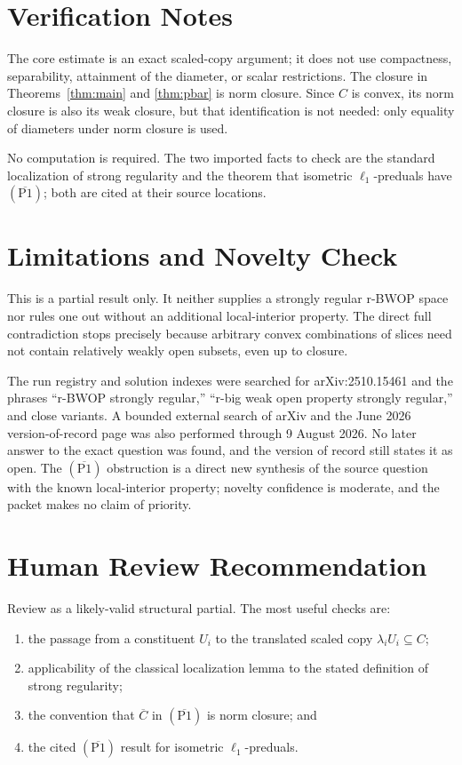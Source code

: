 \documentclass[11pt]{article}
\newcommand{\Pbar}{(\overline{\mathrm{P1}})}
\begin{document}
\section*{Verification Notes}

The core estimate is an exact scaled-copy argument; it does not use compactness,
separability, attainment of the diameter, or scalar restrictions. The closure
in Theorems~\ref{thm:main} and \ref{thm:pbar} is norm closure. Since $C$ is
convex, its norm closure is also its weak closure, but that identification is
not needed: only equality of diameters under norm closure is used.

No computation is required. The two imported facts to check are the standard
localization of strong regularity and the theorem that isometric
$\ell_1$-preduals have $\Pbar$; both are cited at their source locations.

\section*{Limitations and Novelty Check}

This is a partial result only. It neither supplies a strongly regular r-BWOP
space nor rules one out without an additional local-interior property. The
direct full contradiction stops precisely because arbitrary convex combinations
of slices need not contain relatively weakly open subsets, even up to closure.

The run registry and solution indexes were searched for arXiv:2510.15461 and
the phrases ``r-BWOP strongly regular,'' ``r-big weak open property strongly
regular,'' and close variants. A bounded external search of arXiv and the
June 2026 version-of-record page was also performed through 9 August 2026. No
later answer to the exact question was found, and the version of record still
states it as open. The $\Pbar$ obstruction is a direct new synthesis of the
source question with the known local-interior property; novelty confidence is
moderate, and the packet makes no claim of priority.

\section*{Human Review Recommendation}

Review as a likely-valid structural partial. The most useful checks are:
\begin{enumerate}
\item the passage from a constituent $U_i$ to the translated scaled copy
      $\lambda_iU_i\subseteq C$;
\item applicability of the classical localization lemma to the stated
      definition of strong regularity;
\item the convention that $\overline C$ in $\Pbar$ is norm closure; and
\item the cited $\Pbar$ result for isometric $\ell_1$-preduals.
\end{enumerate}
\end{document}

